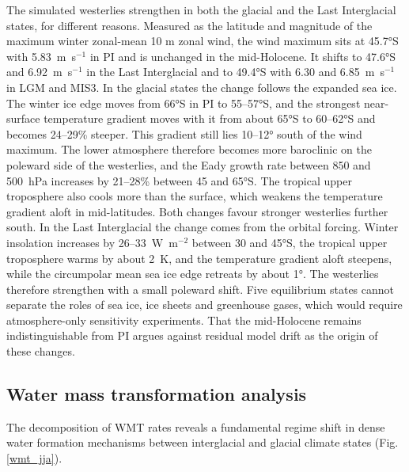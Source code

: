 \documentclass[pdflatex,sn-nature]{sn-jnl}
\begin{document}
The simulated westerlies strengthen in both the glacial and the Last Interglacial states, for different reasons. Measured as the latitude and magnitude of the maximum winter zonal-mean 10 m zonal wind, the wind maximum sits at 45.7°S with 5.83~m~s$^{-1}$ in PI and is unchanged in the mid-Holocene. It shifts to 47.6°S and 6.92~m~s$^{-1}$ in the Last Interglacial and to 49.4°S with 6.30 and 6.85~m~s$^{-1}$ in LGM and MIS3. In the glacial states the change follows the expanded sea ice. The winter ice edge moves from 66°S in PI to 55--57°S, and the strongest near-surface temperature gradient moves with it from about 65°S to 60--62°S and becomes 24--29\% steeper. This gradient still lies 10--12° south of the wind maximum. The lower atmosphere therefore becomes more baroclinic on the poleward side of the westerlies, and the Eady growth rate between 850 and 500~hPa increases by 21--28\% between 45 and 65°S. The tropical upper troposphere also cools more than the surface, which weakens the temperature gradient aloft in mid-latitudes. Both changes favour stronger westerlies further south. In the Last Interglacial the change comes from the orbital forcing. Winter insolation increases by 26--33~W~m$^{-2}$ between 30 and 45°S, the tropical upper troposphere warms by about 2~K, and the temperature gradient aloft steepens, while the circumpolar mean sea ice edge retreats by about 1°. The westerlies therefore strengthen with a small poleward shift. Five equilibrium states cannot separate the roles of sea ice, ice sheets and greenhouse gases, which would require atmosphere-only sensitivity experiments. That the mid-Holocene remains indistinguishable from PI argues against residual model drift as the origin of these changes.


\subsection{Water mass transformation analysis}


The decomposition of WMT rates reveals a fundamental regime shift in dense water formation mechanisms between interglacial and glacial climate states (Fig. \ref{wmt_jja}).
\end{document}
